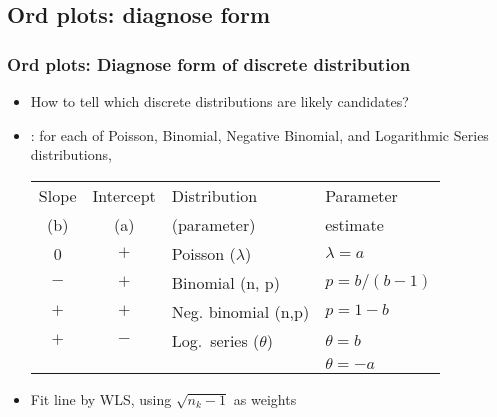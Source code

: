\subsection{Ord plots: diagnose form}
\begin{frame}

\frametitle{Ord plots: Diagnose form of discrete distribution}
\begin{itemize}
\item How to tell which discrete distributions are likely candidates?
\item \citet{Ord:67}: for each of Poisson, Binomial, Negative Binomial, and Logarithmic Series distributions,

\begin{center}
\renewcommand{\arraystretch}{.85}
\begin{tabular}{|ccll|}\hline
Slope & Intercept & Distribution & Parameter \\
(b)   & (a)       & (parameter)  &  estimate \\ \hline
0     &  $+$      &  Poisson (\(\lambda\)) & \(\lambda = a\)    \\
$-$   &  $+$      &  Binomial (n, p)       & \(p = b / (b-1)\)  \\
$+$   &  $+$      &  Neg. binomial (n,p)      & \(p = 1 - b\)      \\
$+$   &  $-$      &  Log.\ series (\(\theta\)) & \(\theta =  b\) \\
      &      &                     &   \(\theta = - a\) \\ \hline
\end{tabular}
\end{center}

\item Fit line by WLS, using $\sqrt{n_k-1}$ as weights
\end{itemize}
\end{frame}

